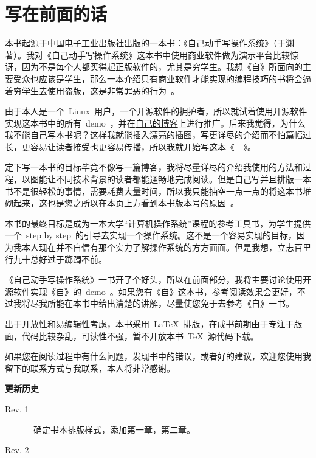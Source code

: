\chapter{写在前面的话} \label{fore}


\begin{kaitext}

本书起源于中国电子工业出版社出版的一本书：《自己动手写操作系统》（于渊著）。我对《自己动手写操作系统》这本书中使用商业软件做为演示平台比较惊讶，因为不是每个人都买得起正版软件的，尤其是穷学生。我想《自》所面向的主要受众也应该是学生，那么一本介绍只有商业软件才能实现的编程技巧的书将会逼着穷学生去使用盗版，这是非常罪恶的行为~\frownie。

由于本人是一个~Linux~用户，一个开源软件的拥护者，所以就试着使用开源软件实现这本书中的所有~demo~，并在\href{http://blog.solrex.cn}{自己的博客}上进行推广。后来我觉得，为什么我不能自己写本书呢？这样我就能插入漂亮的插图，写更详尽的介绍而不怕篇幅过长，更容易让读者接受也更容易传播，所以我就开始写这本《~\BookName~》。

定下写一本书的目标毕竟不像写一篇博客，我将尽量详尽的介绍我使用的方法和过程，以图能让不同技术背景的读者都能通畅地完成阅读。但是自己写并且排版一本书不是很轻松的事情，需要耗费大量时间，所以我只能抽空一点一点的将这本书堆砌起来，这也是您之所以在本页上方看到本书版本号的原因~\smiley。

本书的最终目标是成为一本大学“计算机操作系统”课程的参考工具书，为学生提供一个~step by step~的引导去实现一个操作系统。这不是一个容易实现的目标，因为我本人现在并不自信有那个实力了解操作系统的方方面面。但是我想，立志百里行九十总好过于踯躅不前。

《自己动手写操作系统》一书开了个好头，所以在前面部分，我将主要讨论使用开源软件实现《自》的~demo~。如果您有《自》这本书，参考阅读效果会更好，不过我将尽我所能在本书中给出清楚的讲解，尽量使您免于去参考《自》一书。

出于开放性和易编辑性考虑，本书采用~\LaTeX~排版，在成书前期由于专注于版面，代码比较杂乱，可读性不强，暂不开放本书~\TeX~源代码下载。

如果您在阅读过程中有什么问题，发现书中的错误，或者好的建议，欢迎您使用我留下的联系方式与我联系，本人将非常感谢。
\vskip 1cm
\noindent
{}
\end{kaitext}

\begin{lined}{\textwidth}
\textbf{更新历史}
\small
\begin{description}
    \item[Rev. 1]~确定书本排版样式，添加第一章，第二章。
    \item[Rev. 2]~
\end{description}
\vspace{2ex}
\end{lined}

